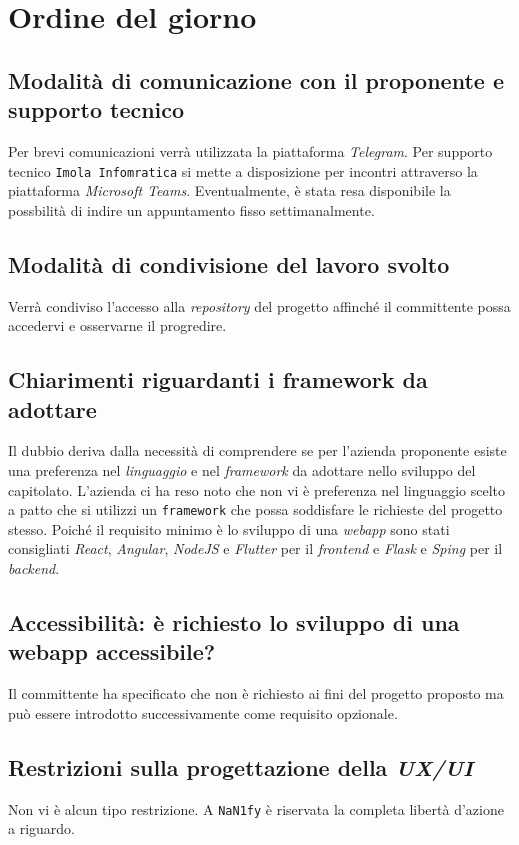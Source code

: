 \section{Ordine del giorno}
\subsection{Modalità di comunicazione con il proponente e supporto tecnico}
    Per brevi comunicazioni verrà utilizzata la piattaforma \textit{Telegram}. Per supporto tecnico \texttt{Imola Infomratica} si mette a disposizione per incontri attraverso la piattaforma \textit{Microsoft Teams}. Eventualmente, è stata resa disponibile la possbilità di indire un appuntamento fisso settimanalmente.
\subsection{Modalità di condivisione del lavoro svolto}
    Verrà condiviso l'accesso alla \textit{repository} del progetto affinché il committente possa accedervi e osservarne il progredire. 
\subsection{Chiarimenti riguardanti i framework da adottare}
    Il dubbio deriva dalla necessità di comprendere se per l'azienda proponente esiste una preferenza nel \textit{linguaggio} e nel \textit{framework} da adottare nello sviluppo del capitolato. L'azienda ci ha reso noto che non vi è preferenza nel linguaggio scelto a patto che si utilizzi un \texttt{framework} che possa soddisfare le richieste del progetto stesso. Poiché il requisito minimo è lo sviluppo di una \textit{webapp} sono stati consigliati \textit{React}, \textit{Angular}, \textit{NodeJS} e \textit{Flutter} per il \textit{frontend} e \textit{Flask} e \textit{Sping} per il \textit{backend}.
\subsection{Accessibilità: è richiesto lo sviluppo di una webapp accessibile?}
    Il committente ha specificato che non è richiesto ai fini del progetto proposto ma può essere introdotto successivamente come requisito opzionale.
\subsection{Restrizioni sulla progettazione della \textit{UX/UI}}
    Non vi è alcun tipo restrizione. A \texttt{NaN1fy} è riservata la completa libertà d'azione a riguardo.
